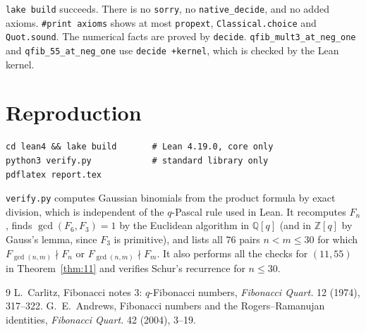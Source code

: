\documentclass[11pt]{article}
\theoremstyle{remark}
\begin{document}
\texttt{lake build} succeeds. There is no \texttt{sorry}, no
\texttt{native\_decide}, and no added axioms. \texttt{\#print axioms} shows at
most \texttt{propext}, \texttt{Classical.choice} and \texttt{Quot.sound}. The
numerical facts are proved by \texttt{decide}. \texttt{qfib\_mult3\_at\_neg\_one}
and \texttt{qfib\_55\_at\_neg\_one} use \texttt{decide +kernel}, which is
checked by the Lean kernel.

\section{Reproduction}
\begin{verbatim}
cd lean4 && lake build       # Lean 4.19.0, core only
python3 verify.py            # standard library only
pdflatex report.tex
\end{verbatim}
\texttt{verify.py} computes Gaussian binomials from the product formula by exact
division, which is independent of the $q$-Pascal rule used in Lean. It
recomputes $F_n$, finds $\gcd(F_6,F_3)=1$ by the Euclidean algorithm in
$\mathbb Q[q]$ (and in $\mathbb Z[q]$ by Gauss's lemma, since $F_3$ is
primitive), and lists all $76$ pairs $n<m\le30$ for which
$F_{\gcd(n,m)}\nmid F_n$ or $F_{\gcd(n,m)}\nmid F_m$. It also performs all the
checks for $(11,55)$ in Theorem~\ref{thm:11} and verifies Schur's recurrence
for $n\le30$.

\begin{thebibliography}{9}
 L.~Carlitz, Fibonacci notes 3: $q$-Fibonacci numbers,
\emph{Fibonacci Quart.} 12 (1974), 317--322.
 G.~E.~Andrews, Fibonacci numbers and the Rogers--Ramanujan
identities, \emph{Fibonacci Quart.} 42 (2004), 3--19.
\end{thebibliography}
\end{document}
